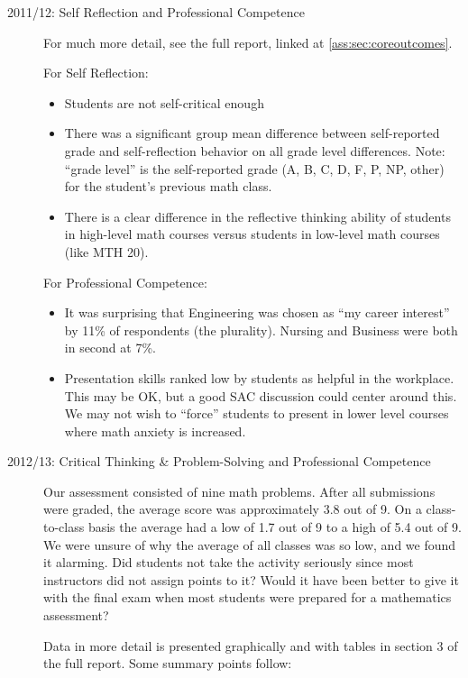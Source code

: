 \begin{description}

\item[2011/12: Self Reflection and Professional Competence]
For much more detail, see the full report, linked at \cref{ass:sec:coreoutcomes}.

For Self Reflection: 
\begin{itemize}
\item Students are not self-critical enough
\item There was a significant group mean difference between self-reported grade
  and self-reflection behavior on all grade level differences.  Note: ``grade
  level'' is the self-reported grade (A, B, C, D, F, P, NP, other) for the
  student's previous math class.
\item There is a clear difference in the reflective thinking ability of students
  in high-level math courses versus students in low-level math courses (like MTH
  20).
\end{itemize}
For Professional Competence:
\begin{itemize}
\item It was surprising that Engineering was chosen as ``my career interest'' by
  11\% of respondents (the plurality). Nursing and Business were both in second
  at 7\%.\
\item Presentation skills ranked low by students as helpful in the workplace.
  This may be OK, but a good SAC discussion could center around this. We may not
  wish to ``force'' students to present in lower level courses where math
  anxiety is increased.
\end{itemize}

\item[2012/13:  Critical Thinking \& Problem-Solving and Professional Competence]

Our assessment consisted of nine math problems.  After all submissions were
graded, the average score was approximately 3.8 out of 9.  On a class-to-class
basis the average had a low of 1.7 out of 9 to a high of 5.4 out of 9.  We were
unsure of why the average of all classes was so low, and we found it alarming.
Did students not take the activity seriously since most instructors did not
assign points to it?  Would it have been better to give it with the final exam
when most students were prepared for a mathematics assessment? 

Data in more detail is presented graphically and with tables in section 3 of the
full report. Some summary points follow:


\end{description}
